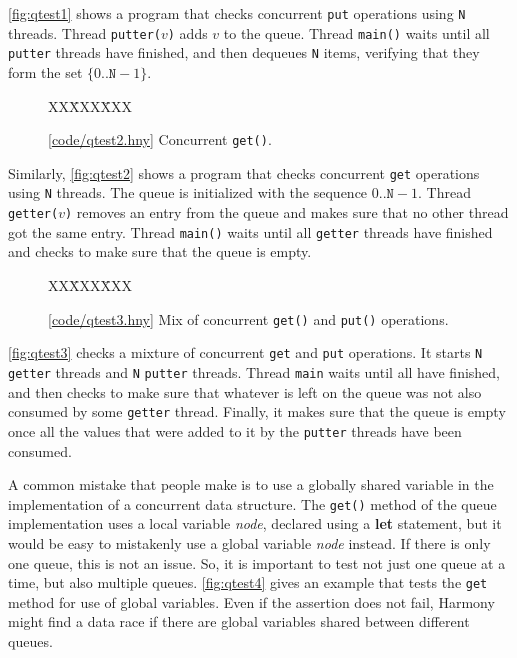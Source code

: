 \documentclass{report}
\newcommand{\harmonysource}[1]{
\begin{tabbing}
XX\=XXX\=XXX\kill
    
\end{tabbing}
}
\newcommand{\harmonylink}[1]{%
[\href{https://harmony.cs.cornell.edu/#1}{\underline{#1}}]%
}
\newenvironment{code}{
\tcolorbox
}{
\endtcolorbox
}
\begin{document}
\autoref{fig:qtest1} shows a program that
checks concurrent \texttt{put} operations using
\texttt{N} threads.  Thread \texttt{putter($v$)}
adds $v$ to the queue.
Thread \texttt{main()} waits until all \texttt{putter}
threads have finished, and then dequeues \texttt{N}
items, verifying that they form the set
$\{ 0 .. \mathtt{N} - 1 \}$.

\begin{figure}
\begin{code}
\harmonysource{qtest2}
\end{code}
\caption{\harmonylink{code/qtest2.hny} Concurrent \texttt{get()}.}
\label{fig:qtest2}
\end{figure}

Similarly, \autoref{fig:qtest2} shows a program that
checks concurrent \texttt{get} operations using
\texttt{N} threads.
The queue is initialized with the sequence
$0 .. \mathtt{N} - 1$.
Thread \texttt{getter($v$)} removes an entry from the
queue and makes sure that no other thread got the
same entry.
Thread \texttt{main()} waits until all \texttt{getter}
threads have finished and checks to make sure that
the queue is empty.

\begin{figure}
\begin{code}
\harmonysource{qtest3}
\end{code}
\caption{\harmonylink{code/qtest3.hny} Mix of concurrent
\texttt{get()} and \texttt{put()} operations.}
\label{fig:qtest3}
\end{figure}

\autoref{fig:qtest3} checks a mixture of
concurrent \texttt{get} and \texttt{put} operations.
It starts \texttt{N} \texttt{getter} threads and
\texttt{N} \texttt{putter} threads.
Thread \texttt{main} waits until all have finished,
and then checks to make sure that whatever is left
on the queue was not also consumed by some
\texttt{getter} thread.
Finally, it makes sure that the queue is empty
once all the values that were added
to it by the \texttt{putter} threads have been consumed.

A common mistake that people make is to use
a globally shared variable in the implementation of
a concurrent data structure.
The \texttt{get()} method of the queue implementation
uses a local variable \textit{node}, declared using
a \textbf{let} statement, but it would be easy to
mistakenly use a global variable \textit{node} instead.
If there is only one queue, this is not an issue.
So, it is important to test not just one queue at a
time, but also multiple queues.
\autoref{fig:qtest4} gives an example that
tests the \texttt{get} method for use of global
variables.  Even if the assertion does not fail,
Harmony might find a data race if there are global
variables shared between different queues.
\end{document}
